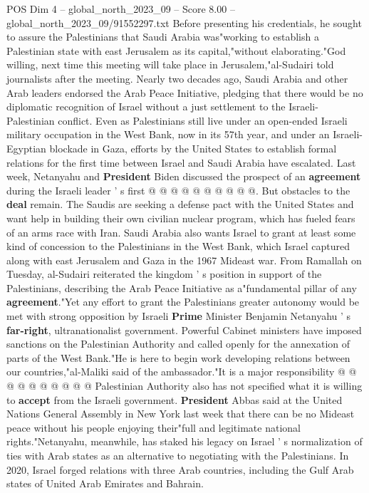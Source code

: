 \begin{textsample}{POS Dim 4 – global\_north\_2023\_09 – Score 8.00 – global\_north\_2023\_09/91552297.txt}
Before presenting his credentials, he sought to assure the Palestinians that Saudi Arabia was"working to establish a Palestinian state with east Jerusalem as its capital,"without elaborating."God willing, next time this meeting will take place in Jerusalem,"al-Sudairi told journalists after the meeting.
Nearly two decades ago, Saudi Arabia and other Arab leaders endorsed the Arab Peace Initiative, pledging that there would be no diplomatic recognition of Israel without a just settlement to the Israeli-Palestinian conflict.
Even as Palestinians still live under an open-ended Israeli military occupation in the West Bank, now in its 57th year, and under an Israeli-Egyptian blockade in Gaza, efforts by the United States to establish formal relations for the first time between Israel and Saudi Arabia have escalated.
Last week, Netanyahu and \textbf{President} Biden discussed the prospect of an \textbf{agreement} during the Israeli leader ' s first @ @ @ @ @ @ @ @ @ @.
But obstacles to the \textbf{deal} remain.
The Saudis are seeking a defense pact with the United States and want help in building their own civilian nuclear program, which has fueled fears of an arms race with Iran.
Saudi Arabia also wants Israel to grant at least some kind of concession to the Palestinians in the West Bank, which Israel captured along with east Jerusalem and Gaza in the 1967 Mideast war.
From Ramallah on Tuesday, al-Sudairi reiterated the kingdom ' s position in support of the Palestinians, describing the Arab Peace Initiative as a"fundamental pillar of any \textbf{agreement}."Yet any effort to grant the Palestinians greater autonomy would be met with strong opposition by Israeli \textbf{Prime} Minister Benjamin Netanyahu ' s \textbf{far-right}, ultranationalist government.
Powerful Cabinet ministers have imposed sanctions on the Palestinian Authority and called openly for the annexation of parts of the West Bank."He is here to begin work developing relations between our countries,"al-Maliki said of the ambassador."It is a major responsibility @ @ @ @ @ @ @ @ @ @ Palestinian Authority also has not specified what it is willing to \textbf{accept} from the Israeli government. \textbf{President} Abbas said at the United Nations General Assembly in New York last week that there can be no Mideast peace without his people enjoying their"full and legitimate national rights."Netanyahu, meanwhile, has staked his legacy on Israel ' s normalization of ties with Arab states as an alternative to negotiating with the Palestinians.
In 2020, Israel forged relations with three Arab countries, including the Gulf Arab states of United Arab Emirates and Bahrain.

\end{textsample}
